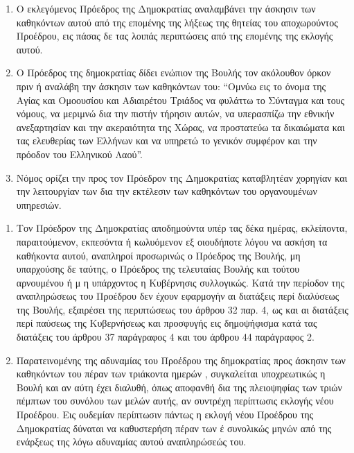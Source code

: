 \documentclass[twoside, a4paper, 10pt]{article}
\begin{document}
\begin{multicols}{2}
\begin{enumerate}
\begin{BigQuote}
\begin{enumerate}
  \item[1.] Ο εκλεγόμενος Πρόεδρος της Δημοκρατίας αναλαμβάνει την άσκησιν των καθηκόντων αυτού από της επομένης της λήξεως της θητείας του αποχωρούντος Προέδρου, εις πάσας δε τας λοιπάς περιπτώσεις από της επομένης της εκλογής αυτού.
  \item[2.] Ο Πρόεδρος της δημοκρατίας δίδει ενώπιον της Βουλής τον ακόλουθον όρκον πριν ή αναλάβη την άσκησιν των καθηκόντων του:
“Ομνύω εις το όνομα της Αγίας και Ομοουσίου και Αδιαιρέτου Τριάδος να φυλάττω το Σύνταγμα και τους νόμους, να μεριμνώ δια την πιστήν τήρησιν αυτών, να υπερασπίζω την εθνικήν ανεξαρτησίαν και την ακεραιότητα της Χώρας, να προστατεύω τα δικαιώματα και τας ελευθερίας των Ελλήνων και να υπηρετώ το γενικόν συμφέρον και την πρόοδον του Ελληνικού Λαού”.
  \item[3.] Νόμος ορίζει την προς τον Πρόεδρον της Δημοκρατίας καταβλητέαν χορηγίαν και την λειτουργίαν των δια την εκτέλεσιν των καθηκόντων του οργανουμένων υπηρεσιών.
\end{enumerate}

\begin{enumerate}
  \item[1.] Τον Πρόεδρον της Δημοκρατίας αποδημούντα υπέρ τας δέκα ημέρας, εκλείποντα, παραιτούμενον, εκπεσόντα ή κωλυόμενον εξ οιουδήποτε λόγου να ασκήση τα καθήκοντα αυτού, αναπληροί προσωρινώς ο Πρόεδρος της Βουλής, μη υπαρχούσης δε ταύτης, ο Πρόεδρος της τελευταίας Βουλής και τούτου αρνουμένου ή μ η υπάρχοντος η Κυβέρνησις συλλογικώς.
Κατά την περίοδον της αναπληρώσεως του Προέδρου δεν έχουν εφαρμογήν αι διατάξεις περί διαλύσεως της Βουλής, εξαιρέσει της περιπτώσεως του άρθρου 32 παρ. 4, ως και αι διατάξεις περί παύσεως της Κυβερνήσεως και προσφυγής εις δημοψήφισμα κατά τας διατάξεις του άρθρου 37 παράγραφος 4 και του άρθρου 44 παράγραφος 2.
  \item[2.] Παρατεινομένης της αδυναμίας του Προέδρου της δημοκρατίας προς άσκησιν των καθηκόντων του πέραν των τριάκοντα ημερών , συγκαλείται υποχρεωτικώς η Βουλή και αν αύτη έχει διαλυθή, όπως αποφανθή δια της πλειοψηφίας των τριών πέμπτων του συνόλου των μελών αυτής, αν συντρέχη περίπτωσις  εκλογής νέου Προέδρου. Εις ουδεμίαν περίπτωσιν πάντως η εκλογή νέου Προέδρου της Δημοκρατίας δύναται να καθυστερήση πέραν των έ συνολικώς μηνών από της ενάρξεως της λόγω αδυναμίας αυτού αναπληρώσεώς του.
\end{enumerate}


\end{BigQuote}
\end{enumerate}
\end{multicols}
\end{document}
